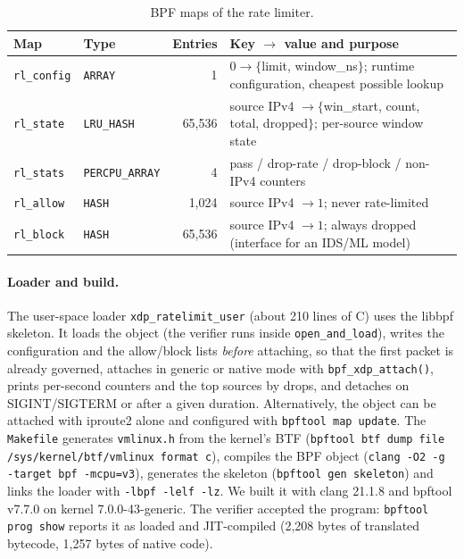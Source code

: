 \begin{table}[htbp]
	\centering\small
	\caption{BPF maps of the rate limiter.}\label{tab:t4-maps}
	\begin{tabularx}{\linewidth}{llrX}
		\toprule
		Map & Type & Entries & Key $\to$ value and purpose \\
		\midrule
		\texttt{rl\_config} & \texttt{ARRAY} & 1 & $0 \to \{$limit, window\_ns$\}$; runtime configuration, cheapest possible lookup \\
		\texttt{rl\_state} & \texttt{LRU\_HASH} & 65,536 & source IPv4 $\to \{$win\_start, count, total, dropped$\}$; per-source window state \\
		\texttt{rl\_stats} & \texttt{PERCPU\_ARRAY} & 4 & pass / drop-rate / drop-block / non-IPv4 counters \\
		\texttt{rl\_allow} & \texttt{HASH} & 1,024 & source IPv4 $\to 1$; never rate-limited \\
		\texttt{rl\_block} & \texttt{HASH} & 65,536 & source IPv4 $\to 1$; always dropped (interface for an IDS/ML model) \\
		\bottomrule
	\end{tabularx}
\end{table}

\paragraph{Loader and build.} The user-space loader \texttt{xdp\_ratelimit\_user} (about 210 lines of C) uses the libbpf skeleton. It loads the object (the verifier runs inside \texttt{open\_and\_load}), writes the configuration and the allow/block lists \emph{before} attaching, so that the first packet is already governed, attaches in generic or native mode with \texttt{bpf\_xdp\_attach()}, prints per-second counters and the top sources by drops, and detaches on SIGINT/SIGTERM or after a given duration. Alternatively, the object can be attached with iproute2 alone and configured with \texttt{bpftool map update}. The \texttt{Makefile} generates \texttt{vmlinux.h} from the kernel's BTF (\texttt{bpftool btf dump file /sys/kernel/btf/vmlinux format c}), compiles the BPF object (\texttt{clang -O2 -g -target bpf -mcpu=v3}), generates the skeleton (\texttt{bpftool gen skeleton}) and links the loader with \texttt{-lbpf -lelf -lz}. We built it with clang 21.1.8 and bpftool v7.7.0 on kernel 7.0.0-43-generic. The verifier accepted the program: \texttt{bpftool prog show} reports it as loaded and JIT-compiled (2,208 bytes of translated bytecode, 1,257 bytes of native code).



